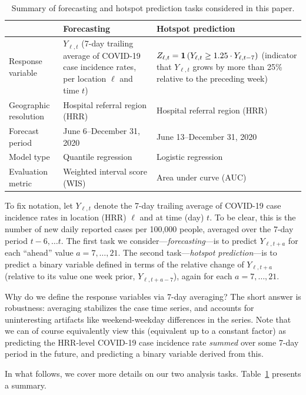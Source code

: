 \documentclass[9pt,twocolumn,twoside,lineno]{pnas-new}
\begin{document}
\begin{table}[t]
  \centering
  \caption{Summary of forecasting and hotspot prediction tasks considered in
    this paper.}
  \begin{tabular}{l p{2.75in} p{2.75in}}
    \toprule
    & \textbf{Forecasting} & \textbf{Hotspot prediction} \\
    \midrule
    Response variable & $Y_{\ell,t}$ (7-day trailing average of COVID-19 case
 incidence rates, per location $\ell$ and time $t$) & $Z_{\ell,t} =
\mathbf{1}\left(Y_{\ell,t} \geq 1.25 \cdot Y_{\ell, t-7}\right)$ (indicator that $Y_{\ell,t}$ 
grows by more than 25\% relative to the preceding week) \\
    Geographic resolution & Hospital referral region (HRR) & Hospital referral
region (HRR) \\ 
    Forecast period & June 6--December 31, 2020 & June 13--December 31, 2020 \\  
    Model type & Quantile regression & Logistic regression \\
    Evaluation metric & Weighted interval score (WIS) & Area under curve (AUC) \\
    \bottomrule
  \end{tabular}
\label{tab:analysis_tasks}
\end{table}

To fix notation, let $Y_{\ell,t}$ denote the 7-day trailing average of COVID-19
case incidence rates in location (HRR) $\ell$ and at time (day) $t$.  To be
clear, this is the number of new daily reported cases per 100,000
people, averaged over the 7-day period $t-6, \ldots t$. The first task we
consider---\textit{forecasting}---is to predict $Y_{\ell,t+a}$ for each
``ahead'' value $a=7,\ldots,21$.  The second task---\textit{hotspot
  prediction}---is to predict a binary variable defined in terms of the relative
change of $Y_{\ell,t+a}$ (relative to its value one week prior,
$Y_{\ell,t+a-7}$), again for each $a=7,\ldots,21$.   

Why do we define the response variables via 7-day averaging? The short answer 
is robustness: averaging stabilizes the case time series, and accounts for 
uninteresting artifacts like weekend-weekday differences in the series.  Note
that we can of course equivalently view this (equivalent up to a constant
factor) as predicting the HRR-level COVID-19 case incidence rate \textit{summed} 
over some 7-day period in the future, and predicting a binary variable derived 
from this. 

In what follows, we cover more details on our two analysis
tasks. Table~\ref{tab:analysis_tasks} presents a summary.   
\end{document}
